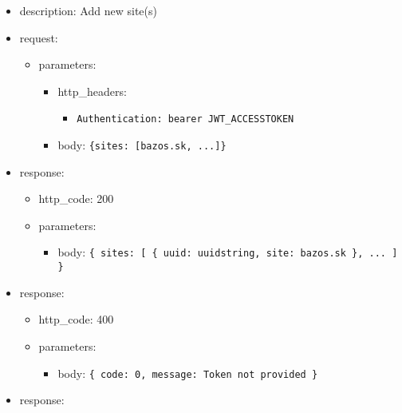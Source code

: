\documentclass[
]{article}
\begin{document}
\begin{itemize}
\item
  description: Add new site(s)
\item
  request:

  \begin{itemize}
  \item
    parameters:

    \begin{itemize}
    \item
      http\_headers:

      \begin{itemize}
      \item
        \texttt{Authentication:\ \textquotesingle{}bearer\ JWT\_ACCESSTOKEN\textquotesingle{}}
      \end{itemize}
    \item
      body:
      \texttt{\{\textquotesingle{}sites\textquotesingle{}:\ {[}\textquotesingle{}bazos.sk\textquotesingle{},\ ...{]}\}}
    \end{itemize}
  \end{itemize}
\item
  response:

  \begin{itemize}
  \item
    http\_code: 200
  \item
    parameters:

    \begin{itemize}
    \item
      body: \texttt{\{
      \textquotesingle{}sites\textquotesingle{}:\ {[}
      	\{
      		\textquotesingle{}uuid\textquotesingle{}:\ \textquotesingle{}uuidstring\textquotesingle{},
      		\textquotesingle{}site\textquotesingle{}:\ \textquotesingle{}bazos.sk\textquotesingle{}
      	\},
      	...
      {]}
      \}}
    \end{itemize}
  \end{itemize}
\item
  response:

  \begin{itemize}
  \item
    http\_code: 400
  \item
    parameters:

    \begin{itemize}
    \item
      body: \texttt{\{
      \textquotesingle{}code\textquotesingle{}:\ 0,\ 
      \textquotesingle{}message\textquotesingle{}:\ \textquotesingle{}Token\ not\ provided\textquotesingle{}
      \}}
    \end{itemize}
  \end{itemize}
\item
  response:


\end{itemize}
\end{document}

